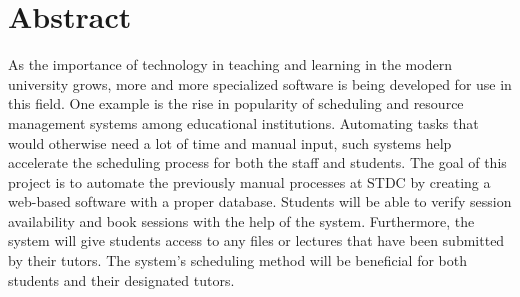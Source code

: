\chapter*{Abstract}

\begin{justify}
As the importance of technology in teaching and learning in the modern university grows, more and more specialized software is being developed for use in this field. One example is the rise in popularity of scheduling and resource management systems among educational institutions. Automating tasks that would otherwise need a lot of time and manual input, such systems help accelerate the scheduling process for both the staff and students. The goal of this project is to automate the previously manual processes at STDC by creating a web-based software with a proper database. Students will be able to verify session availability and book sessions with the help of the system. Furthermore, the system will give students access to any files or lectures that have been submitted by their tutors. The system’s scheduling method will be beneficial for both students and their designated tutors.
\end{justify}